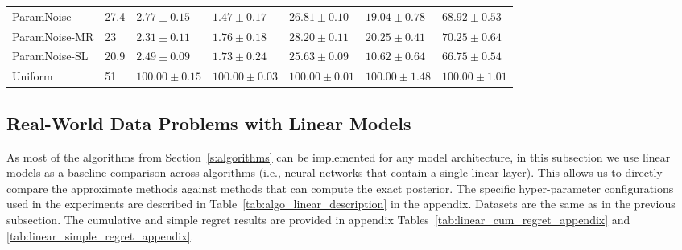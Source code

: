 \documentclass{article} \usepackage{iclr2018_conference,times}
\begin{document}
\begin{table}[ht]
\begin{tabular}{lllllll}
ParamNoise & 27.4& $2.77 \pm 0.15$& $1.47 \pm 0.17$& $26.81 \pm 0.10$& $19.04 \pm 0.78$& $68.92 \pm 0.53$ \\
ParamNoise-MR & 23& $2.31 \pm 0.11$& $1.76 \pm 0.18$& $28.20 \pm 0.11$& $20.25 \pm 0.41$& $70.25 \pm 0.64$ \\
ParamNoise-SL & 20.9& $2.49 \pm 0.09$& $1.73 \pm 0.24$& $25.63 \pm 0.09$& $10.62 \pm 0.64$& $66.75 \pm 0.54$ \\
Uniform & 51& $100.00 \pm 0.15$& $100.00 \pm 0.03$& $100.00 \pm 0.01$& $100.00 \pm 1.48$& $100.00 \pm 1.01$ \\
\bottomrule
\end{tabular}
 \end{table}


\subsection{Real-World Data Problems with Linear Models}
As most of the algorithms from Section~\ref{s:algorithms} can be implemented for any model architecture, in this subsection we use linear models as a baseline comparison across algorithms (i.e., neural networks that contain a single linear layer). This allows us to directly compare the approximate methods against methods that can compute the exact posterior. The specific hyper-parameter configurations used in the experiments are described in Table~\ref{tab:algo_linear_description} in the appendix. Datasets are the same as in the previous subsection. The cumulative and simple regret results are provided in appendix Tables~\ref{tab:linear_cum_regret_appendix} and \ref{tab:linear_simple_regret_appendix}.
\end{document}
